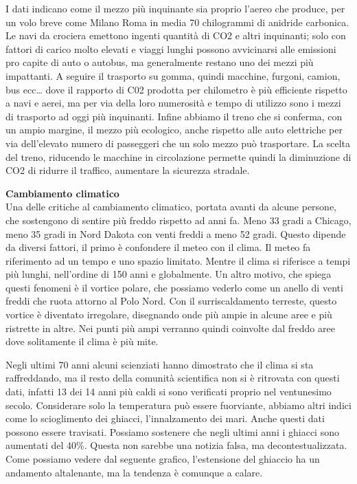 \documentclass[12pt]{book} %
\begin{document}
I dati indicano come il mezzo più
inquinante sia proprio l'aereo che produce, per un volo breve come Milano Roma in media 70
chilogrammi di anidride carbonica. Le navi da crociera emettono ingenti quantità di CO2 e altri inquinanti; solo con fattori di carico molto elevati e viaggi lunghi possono avvicinarsi alle emissioni pro capite di auto o autobus, ma generalmente restano uno dei mezzi più impattanti. A seguire il trasporto
su gomma, quindi macchine, furgoni, camion, bus ecc… dove il rapporto di C02 prodotta per chilometro è più efficiente rispetto a navi e aerei, ma per via della loro numerosità e tempo di utilizzo sono i mezzi di trasporto ad
oggi più inquinanti. Infine abbiamo il treno che si conferma, con un ampio margine, il mezzo più ecologico, anche
rispetto alle auto elettriche per via dell'elevato numero di passeggeri che un solo mezzo può
trasportare. 
La scelta del treno, riducendo le macchine in circolazione permette quindi la diminuzione di CO2 di ridurre il
traffico, aumentare la sicurezza stradale.

\noindent \textbf{\large Cambiamento climatico} \\
Una delle critiche al cambiamento climatico, portata avanti da alcune persone, che sostengono di sentire più freddo rispetto ad anni fa. 
Meno 33 gradi a Chicago, meno 35 gradi in Nord
Dakota con venti freddi a meno 52 gradi. Questo dipende da diversi fattori, il primo è confondere il meteo con il clima. Il meteo fa riferimento ad un tempo e uno spazio limitato. Mentre il clima si riferisce a tempi più lunghi,
nell'ordine di 150 anni e globalmente. Un altro motivo, che spiega questi fenomeni è il vortice polare, che possiamo vederlo come
un anello di venti freddi che ruota attorno al Polo Nord. Con il surriscaldamento terreste, questo vortice è diventato
irregolare, disegnando onde più ampie in alcune aree e più ristrette in altre. Nei punti più ampi verranno quindi
coinvolte dal freddo aree dove solitamente il clima è più mite. 

Negli ultimi 70 anni alcuni scienziati hanno dimostrato che il clima si sta raffreddando, ma il resto della comunità
scientifica non si è ritrovata con questi dati, infatti 13 dei 14 anni più caldi si sono verificati proprio nel
ventunesimo secolo. Considerare solo la temperatura può essere fuorviante, abbiamo altri indici come lo scioglimento
dei ghiacci, l'innalzamento dei mari. Anche questi dati possono essere travisati. Possiamo sostenere che negli ultimi anni i ghiacci sono aumentati del 40\%. Questa non sarebbe una notizia falsa, ma decontestualizzata. Come possiamo vedere dal seguente grafico, l'estensione del ghiaccio ha un andamento altalenante, ma la tendenza è comunque a calare.
\end{document}
